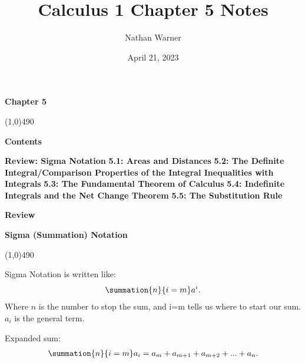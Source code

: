 \documentclass{report}
\title{\Huge{Calculus 1 Chapter 5 Notes}}
\author{\huge{Nathan Warner}}
\date{\huge{April 21, 2023}}
\begin{document}
\maketitle
\begin{center}
  \begin{Huge}
    \textbf{Chapter 5}
  \end{Huge}
\end{center}
\line(1,0){490}
\bigbreak \noindent \bigbreak \noindent  
\begin{Huge}
  \noindent \textbf{Contents}
\end{Huge}
\bigbreak \noindent 
\begin{Large}
  \bigbreak \noindent
  \textbf{Review: Sigma Notation}
  \bigbreak \noindent \bigbreak \noindent 
  \textbf{5.1: Areas and Distances}
  \bigbreak \noindent \bigbreak \noindent 
  \textbf{5.2: The Definite Integral/Comparison Properties of the Integral Inequalities with Integrals}
  \bigbreak \noindent \bigbreak \noindent 
  \textbf{5.3: The Fundamental Theorem of Calculus}
  \bigbreak \noindent \bigbreak \noindent 
  \textbf{5.4: Indefinite Integrals and the Net Change Theorem}
  \bigbreak \noindent \bigbreak \noindent 
  \textbf{5.5: The Substitution Rule}
\end{Large}
\pagebreak \bigbreak \noindent

\pagebreak \bigbreak \noindent
\begin{Large}
  \begin{mdframed}
    \begin{center}
      \textbf{Review}
    \end{center}
  \end{mdframed}
\end{Large}
\begin{Large}
  \begin{center}
    \textbf{Sigma (Summation) Notation}
  \end{center}
\end{Large}
\line(1,0){490}

\bigbreak \noindent \bigbreak \noindent 
Sigma Notation is written like:
\begin{align*}
  \summation{n}{i=m}a^{i}
.\end{align*}
\bigbreak \noindent
Where $n$ is the number to stop the sum, and i=m tells us where to start our sum. $a_i$ is the general term.

\bigbreak \noindent 
Expanded sum:
\begin{align*}
  \summation{n}{i=m}a_i=a_m + a_{m+1} + a_{m+2} + ... + a_n
.\end{align*}
\end{document}
